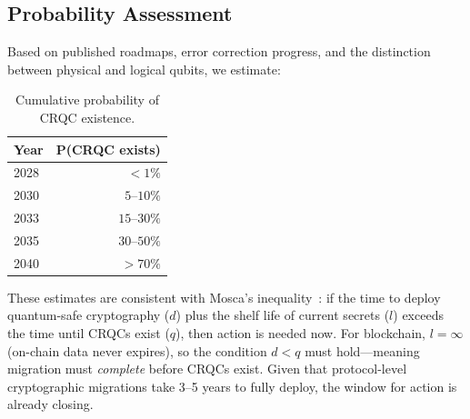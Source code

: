 \subsection{Probability Assessment}

Based on published roadmaps, error correction progress, and the distinction between
physical and logical qubits, we estimate:

\begin{table}[ht]
\centering
\caption{Cumulative probability of CRQC existence.}
\label{tab:crqc-probability}
\begin{tabular}{lr}
\toprule
\textbf{Year} & \textbf{P(CRQC exists)} \\
\midrule
2028 & $< 1\%$ \\
2030 & $5\text{--}10\%$ \\
2033 & $15\text{--}30\%$ \\
2035 & $30\text{--}50\%$ \\
2040 & $> 70\%$ \\
\bottomrule
\end{tabular}
\end{table}

These estimates are consistent with Mosca's inequality~\cite{mosca2018}: if the time
to deploy quantum-safe cryptography ($d$) plus the shelf life of current secrets
($l$) exceeds the time until CRQCs exist ($q$), then action is needed now. For
blockchain, $l = \infty$ (on-chain data never expires), so the condition $d < q$
must hold---meaning migration must \emph{complete} before CRQCs exist. Given that
protocol-level cryptographic migrations take 3--5 years to fully deploy, the window
for action is already closing.

